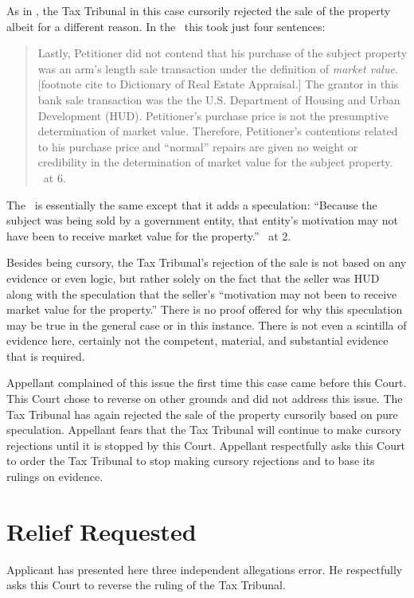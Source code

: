 \documentclass[12pt,\documentclassflag]{michiganCourtOfAppealsBrief}
\begin{document}
As in \cite[s]{Jones & Laughlin}, the Tax Tribunal in this case cursorily rejected the sale of the property albeit for a different reason. In the \FOJ\ this took just four sentences: 

\begin{quote}
	Lastly, Petitioner did not contend that his purchase of the subject property was an arm's length sale transaction under the definition of \textit{market value}. [footnote cite to Dictionary of Real Estate Appraisal.] The grantor in this bank sale transaction was the the U.S. Department of Housing and Urban Development (HUD). Petitioner's purchase price is not the presumptive determination of market value. Therefore, Petitioner's contentions related to his purchase price and ``normal'' repairs are given no weight or credibility in the determination of market value for the subject property. \FOJ\ at 6.
\end{quote}

The \orderDenying\ is essentially the same except that it adds a speculation: ``Because the subject was being sold by a government entity, that entity's motivation may not have been to receive market value for the property.'' \orderDenying\ at 2.

Besides being cursory, the Tax Tribunal's rejection of the sale is not based on any evidence or even logic, but rather solely on the fact that the seller was HUD along with the speculation that the seller's ``motivation may not been to receive market value for the property.'' There is no proof offered for why this speculation may be true in the general case or in this instance. There is not even a scintilla of evidence here, certainly not the competent, material, and substantial evidence that is required.

Appellant complained of this issue the first time this case came before this Court. This Court chose to reverse on other grounds and did not address this issue. The Tax Tribunal has again rejected the sale of the property cursorily based on pure speculation. Appellant fears that the Tax Tribunal will continue to make cursory rejections until it is stopped by this Court. Appellant respectfully asks this Court to order the Tax Tribunal to stop making cursory rejections and to base its rulings on evidence.

\section{Relief Requested}

Applicant has presented here three independent allegations error. He respectfully asks this Court to reverse the ruling of the Tax Tribunal. 
\end{document}
